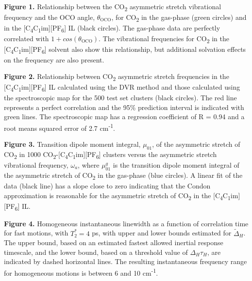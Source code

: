 \documentclass[]{article}
\begin{document}
\emph{\\
}


\textbf{Figure 1.} Relationship between the CO\textsubscript{2} asymmetric stretch vibrational frequency and the OCO angle, \(\theta_{\text{OCO}}\), for CO\textsubscript{2} in the gas-phase (green circles) and in the {[}C\textsubscript{4}C\textsubscript{1}im{]}{[}PF\textsubscript{6}{]} IL (black circles). The gas-phase data are perfectly correlated with \(1 + cos(\theta_{\text{OCO}})\). The vibrational frequencies for CO\textsubscript{2} in the {[}C\textsubscript{4}C\textsubscript{1}im{]}{[}PF\textsubscript{6}{]} solvent also show this relationship, but additional solvation effects on the frequency are also present.


\textbf{Figure 2.} Relationship between CO\textsubscript{2} asymmetric stretch frequencies in the {[}C\textsubscript{4}C\textsubscript{1}im{]}{[}PF\textsubscript{6}{]} IL calculated using the DVR method and those calculated using the spectroscopic map for the 500 test set clusters (black circles). The red line represents a perfect correlation and the 95\% prediction interval is indicated with green lines. The spectroscopic map has a regression coefficient of R = 0.94 and a root means squared error of 2.7 cm\textsuperscript{-1}.


\textbf{Figure 3.} Transition dipole moment integral, \(\mu_{01}\), of the asymmetric stretch of CO\textsubscript{2} in 1000 CO\textsubscript{2}-{[}C\textsubscript{4}C\textsubscript{1}im{]}{[}PF\textsubscript{6}{]} clusters versus the asymmetric stretch vibrational frequency, \(\omega_{a}\), where \(\mu_{01}^{g}\) is the transition dipole moment integral of the asymmetric stretch of CO\textsubscript{2} in the gas-phase (blue circles). A linear fit of the data (black line) has a slope close to zero indicating that the Condon approximation is reasonable for the asymmetric stretch of CO\textsubscript{2} in the {[}C\textsubscript{4}C\textsubscript{1}im{]}{[}PF\textsubscript{6}{]} IL.


\textbf{Figure 4.} Homogeneous instantaneous linewidth as a function of correlation time for fast motions, with \(T_{2}^{*} = 4\) ps, with upper and lower bounds estimated for \({\widetilde{\Delta}}_{H}\). The upper bound, based on an estimated fastest allowed inertial response timescale, and the lower bound, based on a threshold value of \(\Delta_{H}\tau_{H}\), are indicated by dashed horizontal lines. The resulting instantaneous frequency range for homogeneous motions is between 6 and 10 cm\textsuperscript{-1}.
\end{document}
